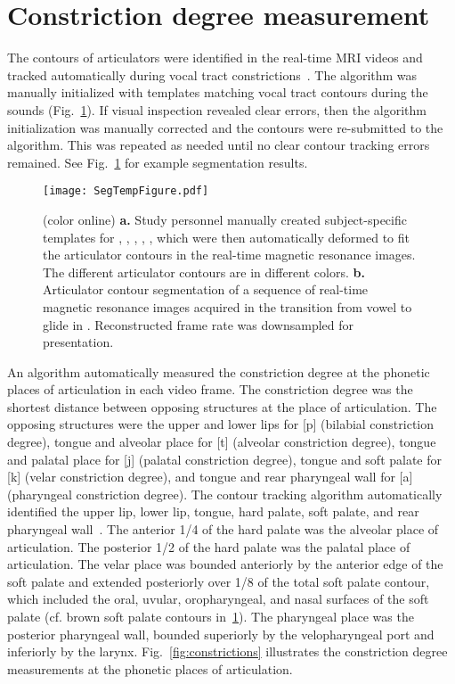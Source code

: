 \documentclass[preprint]{JASAnew}\usepackage[]{graphicx}\usepackage[]{color}
\begin{document}
\section{Constriction degree measurement}
\label{sec:cd}

The contours of articulators were identified in the real-time MRI videos and tracked automatically during vocal tract constrictions~\citep{bresch2009region}. The algorithm was manually initialized with templates matching vocal tract contours during the sounds \textipa{[a], [j], [p], [t], [k]} (Fig.~\ref{fig:segtemp}). 
%
If visual inspection revealed clear errors, then the algorithm initialization was manually corrected and the contours were re-submitted to the algorithm. This was repeated as needed until no clear contour tracking errors remained. 
%
See Fig.~\ref{fig:segtemp} for example segmentation results.

\begin{figure}

\texttt{[image: SegTempFigure.pdf]}

\caption{(color online) {\bf a.} Study personnel manually created subject-specific templates for \textipa{[a]}, \textipa{[i]}, \textipa{[p]}, \textipa{[t]}, \textipa{[k]}, which were then automatically deformed to fit the articulator contours in the real-time magnetic resonance images. The different articulator contours are in different colors.
{\bf b.} Articulator contour segmentation of a sequence of real-time magnetic resonance images acquired in the transition from vowel \textipa{[a]} to glide \textipa{[j]} in \textipa{[aja]}. Reconstructed frame rate was downsampled for presentation.}
\label{fig:segtemp}
\end{figure}



An algorithm automatically measured the constriction degree at the phonetic places of articulation in each video frame. 
%
The constriction degree was the shortest distance between opposing structures at the place of articulation. 
%
The opposing structures were the upper and lower lips for [p] (bilabial constriction degree), tongue and alveolar place for [t] (alveolar constriction degree), tongue and palatal place for [j] (palatal constriction degree), tongue and soft palate for [k] (velar constriction degree), and tongue and rear pharyngeal wall for [a] (pharyngeal constriction degree). 
%
The contour tracking algorithm automatically identified the upper lip, lower lip, tongue, hard palate, soft palate, and rear pharyngeal wall~\citep{bresch2009region}.  
%
The anterior \num{1/4} of the hard palate was the alveolar place of articulation. 
%
The posterior \num{1/2} of the hard palate was the palatal place of articulation.
%
The velar place was bounded anteriorly by the anterior edge of the soft palate and extended posteriorly over \num{1/8} of the total soft palate contour, which included the oral, uvular, oropharyngeal, and nasal surfaces of the soft palate (cf. brown soft palate contours in~\ref{fig:segtemp}).
%
The pharyngeal place was the posterior pharyngeal wall, bounded superiorly by the velopharyngeal port and inferiorly by the larynx. 
%
Fig.~\ref{fig:constrictions} illustrates the constriction degree measurements at the phonetic places of articulation.
\end{document}
